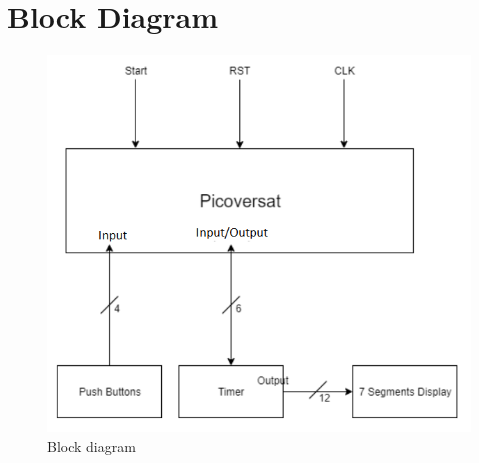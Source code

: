\section{Block Diagram}



\begin{figure}[H]
    \centerline{\includegraphics[width=16cm]{figures/periferal_d.png}}
    \vspace{0cm}\caption{Block diagram}
    \label{fig:Block Diagram}
\end{figure}

\clearpage


